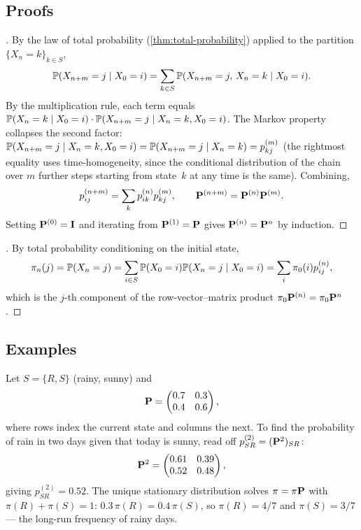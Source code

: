 \subsection*{Proofs}

\begin{proof}[]
By the law of total probability (\cref{thm:total-probability})
applied to the partition $\{X_n = k\}_{k \in S}$,
\[
  \mathbb{P}(X_{n+m} = j \mid X_0 = i) = \sum_{k \in S} \mathbb{P}(X_{n+m} = j,\, X_n = k \mid X_0 = i).
\]
By the multiplication rule, each term equals
$\mathbb{P}(X_n = k \mid X_0 = i) \cdot \mathbb{P}(X_{n+m} = j \mid X_n = k, X_0 = i)$.
The Markov property collapses the second factor:
$\mathbb{P}(X_{n+m} = j \mid X_n = k, X_0 = i) = \mathbb{P}(X_{n+m} = j \mid X_n = k) = p_{kj}^{(m)}$
(the rightmost equality uses time-homogeneity, since the conditional
distribution of the chain over $m$ further steps starting from
state~$k$ at any time is the same). Combining,
\[
  p_{ij}^{(n+m)} = \sum_{k} p_{ik}^{(n)} p_{kj}^{(m)}, \qquad \mathbf{P}^{(n+m)} = \mathbf{P}^{(n)} \mathbf{P}^{(m)}.
\]
Setting $\mathbf{P}^{(0)} = \mathbf{I}$ and iterating from $\mathbf{P}^{(1)} = \mathbf{P}$
gives $\mathbf{P}^{(n)} = \mathbf{P}^n$ by induction.
\end{proof}

\begin{proof}[]
By total probability conditioning on the initial state,
\[
  \pi_n(j) = \mathbb{P}(X_n = j) = \sum_{i \in S} \mathbb{P}(X_0 = i) \mathbb{P}(X_n = j \mid X_0 = i) = \sum_i \pi_0(i) p_{ij}^{(n)},
\]
which is the $j$-th component of the row-vector–matrix product
$\pi_0 \mathbf{P}^{(n)} = \pi_0 \mathbf{P}^n$.
\end{proof}

\subsection*{Examples}

\begin{example}
\label{ex:two-state-chain}
Let $S = \{R, S\}$ (rainy, sunny) and
\[
  \mathbf{P} = \begin{pmatrix} 0.7 & 0.3 \\ 0.4 & 0.6 \end{pmatrix},
\]
where rows index the current state and columns the next. To find
the probability of rain in two days given that today is sunny,
read off $p_{SR}^{(2)} = (\mathbf{P}^2)_{SR}$:
\[
  \mathbf{P}^2 = \begin{pmatrix} 0.61 & 0.39 \\ 0.52 & 0.48 \end{pmatrix},
\]
giving $p_{SR}^{(2)} = 0.52$. The unique stationary distribution
solves $\pi = \pi \mathbf{P}$ with $\pi(R) + \pi(S) = 1$:
$0.3\, \pi(R) = 0.4\, \pi(S)$, so $\pi(R) = 4/7$ and $\pi(S) = 3/7$ —
the long-run frequency of rainy days.
\end{example}

